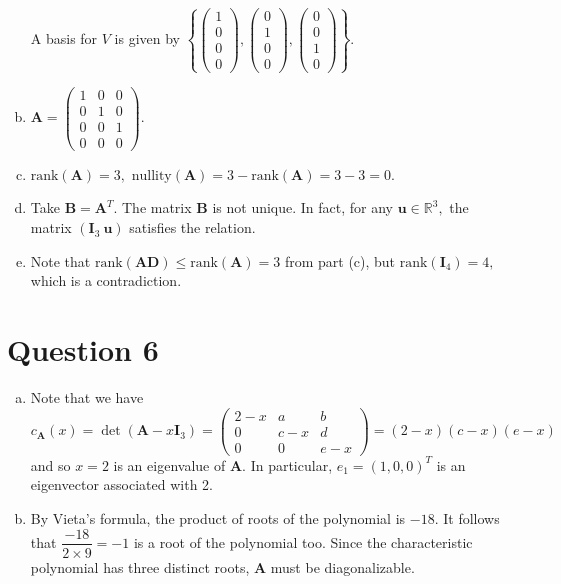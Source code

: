 \documentclass{article}
\begin{document}
\begin{enumerate}[(a)]
    A basis for $V$ is given by $\left\{\begin{pmatrix}1\\0\\0\\0\end{pmatrix},\begin{pmatrix}0\\1\\0\\0\end{pmatrix},\begin{pmatrix}0\\0\\1\\0\end{pmatrix}\right\}.$
    \item $\textbf{A}=\begin{pmatrix}1&0&0\\0&1&0\\0&0&1\\0&0&0\end{pmatrix}.$
    \item $\text{rank}(\textbf{A})=3,$ $\text{nullity}(\textbf{A})=3-\text{rank}(\textbf{A})=3-3=0.$
    \item Take $\textbf{B}=\textbf{A}^T.$ The matrix $\textbf{B}$ is not unique. In fact, for any $\textbf{u}\in\mathbb{R}^3,$ the matrix $(\textbf{I}_3\ \textbf{u})$ satisfies the relation.
    \item Note that $\text{rank}(\textbf{AD})\leq\text{rank}(\textbf{A})=3$ from part (c), but $\text{rank}(\textbf{I}_4)=4,$ which is a contradiction.
\end{enumerate}
\section*{Question 6}
\begin{enumerate}[(a)]
    \item Note that we have $$c_{\textbf{A}}(x)=\det(\textbf{A}-x\textbf{I}_3)=\begin{pmatrix}2-x&a&b\\0&c-x&d\\0&0&e-x\end{pmatrix}=(2-x)(c-x)(e-x)$$ and so $x=2$ is an eigenvalue of $\textbf{A}.$ In particular, $e_1=(1,0,0)^T$ is an eigenvector associated with 2.
    \item By Vieta's formula, the product of roots of the polynomial is $-18.$ It follows that $\dfrac{-18}{2\times9}=-1$ is a root of the polynomial too. Since the characteristic polynomial has three distinct roots, $\textbf{A}$ must be diagonalizable.
\end{enumerate}
\end{document}
